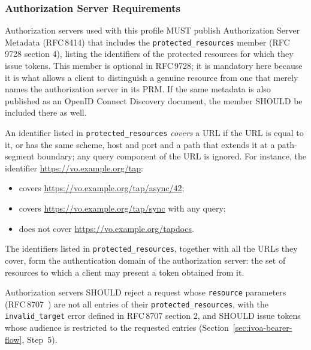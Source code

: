 \documentclass[11pt,a4paper]{ivoa}
\newcommand{\rfc}[1]{RFC\,#1}
\begin{document}
\subsubsection{Authorization Server Requirements}\label{sec:ivoa-bearer-as}

Authorization servers used with this profile MUST publish Authorization Server
Metadata (\rfc{8414}) that includes the \verb|protected_resources| member
(\rfc{9728} section 4), listing the identifiers of the protected resources for
which they issue tokens. This member is optional in \rfc{9728}; it is
mandatory here because it is what allows a client to distinguish a genuine
resource from one that merely names the authorization server in its PRM. If
the same metadata is also published as an OpenID Connect Discovery document,
the member SHOULD be included there as well.

An identifier listed in \verb|protected_resources| \emph{covers} a URL if the
URL is equal to it, or has the same scheme, host and port and a path that
extends it at a path-segment boundary; any query component of the URL is
ignored. For instance, the identifier \url{https://vo.example.org/tap}:
\begin{itemize}
  \item covers \url{https://vo.example.org/tap/async/42};
  \item covers \url{https://vo.example.org/tap/sync} with any query;
  \item does not cover \url{https://vo.example.org/tapdocs}.
\end{itemize}
The identifiers listed in \verb|protected_resources|, together with all the
URLs they cover, form the authentication domain of the authorization server:
the set of resources to which a client may present a token obtained from it.

Authorization servers SHOULD reject a request whose \verb|resource|
parameters (\rfc{8707}~\citep{std:RFC8707}) are not all entries of their
\verb|protected_resources|, with the \verb|invalid_target| error defined in
\rfc{8707} section 2, and SHOULD issue tokens whose audience is restricted
to the requested entries (Section~\ref{sec:ivoa-bearer-flow}, Step~5).
\end{document}
